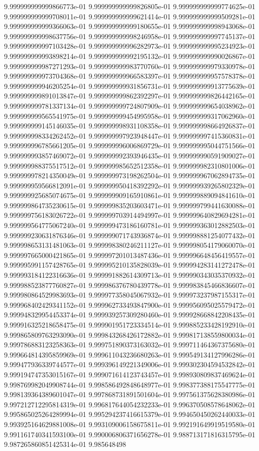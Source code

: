 9.999999999999866773e-01	9.999999999999826805e-01	9.999999999999774625e-01	9.999999999999708011e-01	9.999999999999621414e-01	9.999999999999509281e-01	9.999999999999366063e-01	9.999999999999180655e-01	9.999999999998943068e-01	9.999999999998637756e-01	9.999999999998246958e-01	9.999999999997745137e-01	9.999999999997103428e-01	9.999999999996282973e-01	9.999999999995234923e-01	9.999999999993898214e-01	9.999999999992195132e-01	9.999999999990026867e-01	9.999999999987271293e-01	9.999999999983770760e-01	9.999999999979330978e-01	9.999999999973704368e-01	9.999999999966583397e-01	9.999999999957578378e-01	9.999999999946205254e-01	9.999999999931856731e-01	9.999999999913775639e-01	9.999999999891013847e-01	9.999999999862392297e-01	9.999999999826442165e-01	9.999999999781337134e-01	9.999999999724807909e-01	9.999999999654038962e-01	9.999999999565541975e-01	9.999999999454995958e-01	9.999999999317062960e-01	9.999999999145146035e-01	9.999999998931108358e-01	9.999999998664926837e-01	9.999999998334262452e-01	9.999999997923948447e-01	9.999999997415360831e-01	9.999999996785661205e-01	9.999999996006869729e-01	9.999999995044751566e-01	9.999999993857469072e-01	9.999999992393946435e-01	9.999999990591909027e-01	9.999999988375517512e-01	9.999999985652512358e-01	9.999999982310801006e-01	9.999999978214350049e-01	9.999999973198262504e-01	9.999999967062894735e-01	9.999999959566812091e-01	9.999999950418392292e-01	9.999999939265802329e-01	9.999999925685074675e-01	9.999999909165910861e-01	9.999999889094841610e-01	9.999999864735230615e-01	9.999999835203603471e-01	9.999999799441630088e-01	9.999999756183026722e-01	9.999999703914494997e-01	9.999999640829694281e-01	9.999999564775067240e-01	9.999999473186160781e-01	9.999999363012882503e-01	9.999999230631876346e-01	9.999999071743936874e-01	9.999998881254077432e-01	9.999998653131481063e-01	9.999998380246211127e-01	9.999998054179060070e-01	9.999997665000421865e-01	9.999997201013487436e-01	9.999996648456419557e-01	9.999995991157428765e-01	9.999995210135828039e-01	9.999994283141272478e-01	9.999993184122316636e-01	9.999991882614309713e-01	9.999990343035370932e-01	9.999988523877760827e-01	9.999986376780439778e-01	9.999983845466836607e-01	9.999980864529983693e-01	9.999977358045067932e-01	9.999973237987155317e-01	9.999968402429341152e-01	9.999962733493847900e-01	9.999956095025579472e-01	9.999948329954453374e-01	9.999939257309280460e-01	9.999928668842208435e-01	9.999916325218658475e-01	9.999901951723334514e-01	9.999885233428192910e-01	9.999865809763293090e-01	9.999843268426172882e-01	9.999817138559800034e-01	9.999786883123258363e-01	9.999751890373163032e-01	9.999711464367375680e-01	9.999664814395859969e-01	9.999611043236680263e-01	9.999549134127996286e-01	9.999477936339744577e-01	9.999396149221349006e-01	9.999302304594532842e-01	9.999194747353015167e-01	9.999071614123743457e-01	9.998930809837469624e-01	9.998769982049908744e-01	9.998586492848648977e-01	9.998377388175547775e-01	9.998139364389601047e-01	9.997868731891501604e-01	9.997561375628380986e-01	9.997212712295814319e-01	9.996817644054232233e-01	9.996370508578648062e-01	9.995865025264289994e-01	9.995294237416615379e-01	9.994650450262440033e-01	9.993925164629881008e-01	9.993109006158675811e-01	9.992191649919519580e-01	9.991161740341593100e-01	9.990006806371656278e-01	9.988713171816315795e-01	9.987265860851425314e-01	9.985648498